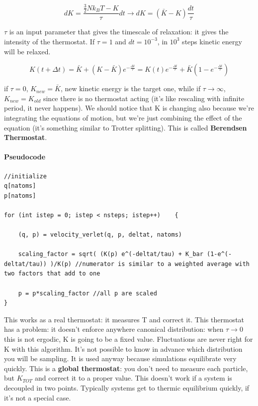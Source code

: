 \documentclass[a4paper, italian, openany]{book}
\begin{document}
$$dK = \frac{\frac{3}{2}N k_B T - K}{\tau} dt \rightarrow dK = (\bar{K} - K) \frac{dt}{\tau}$$

$\tau$ is an input parameter that gives the timescale of relaxation: it gives the intensity of the thermostat. If $\tau =1$ and $dt = 10^{-3}$, in $10^3$ steps kinetic energy will be relaxed.

$$K(t+\Delta t) = \bar{K} + (K - \bar{K})e^{-\frac{\Delta t}{\tau}} = K(t) e^{-\frac{\Delta t}{\tau}} + \bar{K}\left ( 1- e^{-\frac{\Delta t}{\tau}} \right )$$

if $\tau=0$, $K_{new} = \bar{K}$, new kinetic energy is the target one, while if $\tau \to \infty$, $K_{new}=K_{old}$ since there is no thermostat acting (it's like rescaling with infinite period, it never happens). We should notice that K is changing also because we're integrating the equations of motion, but we're just combining the effect of the equation (it's something similar to Trotter splitting). This is called \textbf{Berendsen Thermostat}.

\paragraph{Pseudocode}

\begin{lstlisting}
//initialize
q[natoms]
p[natoms]

for (int istep = 0; istep < nsteps; istep++)	{
	
	(q, p) = velocity_verlet(q, p, deltat, natoms)
	
	scaling_factor = sqrt( (K(p) e^(-deltat/tau) + K_bar (1-e^(-deltat/tau)) )/K(p) //numerator is similar to a weighted average with two factors that add to one
	
	p = p*scaling_factor //all p are scaled
}
\end{lstlisting}

This works as a real thermostat: it measures T and correct it. This thermostat has a problem: it doesn't enforce anywhere canonical distribution: when $\tau \to 0$ this is not ergodic, K is going to be a fixed value. Fluctuations are never right for K with this algorithm. It's not possible to know in advance which distribution you will be sampling. It is used anyway because simulations equilibrate very quickly.\newline
This is a \textbf{global thermostat}: you don't need to measure each particle, but $K_{TOT}$ and correct it to a proper value. This doesn't work if a system is decoupled in two points. Typically systems get to thermic equilibrium quickly, if it's not a special case.
\end{document}

